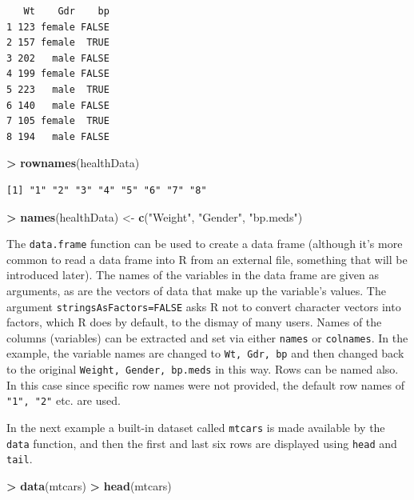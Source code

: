 \documentclass[
]{krantz}
\makeatletter
\newenvironment{Shaded}{\begin{snugshade}}{\end{snugshade}}
\newcommand{\KeywordTok}[1]{\textcolor[rgb]{0.27,0.27,0.27}{\textbf{#1}}}
\newcommand{\NormalTok}[1]{#1}
\newcommand{\OperatorTok}[1]{\textcolor[rgb]{0.43,0.43,0.43}{\textbf{#1}}}
\newcommand{\StringTok}[1]{\textcolor[rgb]{0.5,0.5,0.5}{#1}}
\newenvironment{kframe}{%
\medskip{}
\setlength{\fboxsep}{.8em}
 \def\at@end@of@kframe{}%
 \ifinner\ifhmode%
  \def\at@end@of@kframe{\end{minipage}}%
  \begin{minipage}{\columnwidth}%
 \fi\fi%
 \def\FrameCommand##1{\hskip\@totalleftmargin \hskip-\fboxsep
 \colorbox{shadecolor}{##1}\hskip-\fboxsep
     \hskip-\linewidth \hskip-\@totalleftmargin \hskip\columnwidth}%
 \MakeFramed {\advance\hsize-\width
   \@totalleftmargin\z@ \linewidth\hsize
   \@setminipage}}%
 {\par\unskip\endMakeFramed%
 \at@end@of@kframe}
\renewenvironment{Shaded}{\begin{kframe}}{\end{kframe}}
\makeatother
\begin{document}
\begin{verbatim}
   Wt    Gdr    bp
1 123 female FALSE
2 157 female  TRUE
3 202   male FALSE
4 199 female FALSE
5 223   male  TRUE
6 140   male FALSE
7 105 female  TRUE
8 194   male FALSE
\end{verbatim}

\begin{Shaded}
\begin{Highlighting}[]
\OperatorTok{\textgreater{}}\StringTok{ }\KeywordTok{rownames}\NormalTok{(healthData)}
\end{Highlighting}
\end{Shaded}

\begin{verbatim}
[1] "1" "2" "3" "4" "5" "6" "7" "8"
\end{verbatim}

\begin{Shaded}
\begin{Highlighting}[]
\OperatorTok{\textgreater{}}\StringTok{ }\KeywordTok{names}\NormalTok{(healthData) \textless{}{-}}\StringTok{ }\KeywordTok{c}\NormalTok{(}\StringTok{"Weight"}\NormalTok{, }\StringTok{"Gender"}\NormalTok{, }\StringTok{"bp.meds"}\NormalTok{)}
\end{Highlighting}
\end{Shaded}

The \texttt{data.frame} function can be used to create a data frame (although it's more common to read a data frame into R from an external file, something that will be introduced later). The names of the variables in the data frame are given as arguments, as are the vectors of data that make up the variable's values. The argument \texttt{stringsAsFactors=FALSE} asks R not to convert character vectors into factors, which R does by default, to the dismay of many users. Names of the columns (variables) can be extracted and set via either \texttt{names} or \texttt{colnames}. In the example, the variable names are changed to \texttt{Wt,\ Gdr,\ bp} and then changed back to the original \texttt{Weight,\ Gender,\ bp.meds} in this way. Rows can be named also. In this case since specific row names were not provided, the default row names of \texttt{"1",\ "2"} etc. are used.

In the next example a built-in dataset called \texttt{mtcars} is made available by the \texttt{data} function, and then the first and last six rows are displayed using \texttt{head} and \texttt{tail}.

\begin{Shaded}
\begin{Highlighting}[]
\OperatorTok{\textgreater{}}\StringTok{ }\KeywordTok{data}\NormalTok{(mtcars)}
\OperatorTok{\textgreater{}}\StringTok{ }\KeywordTok{head}\NormalTok{(mtcars)}
\end{Highlighting}
\end{Shaded}
\end{document}
